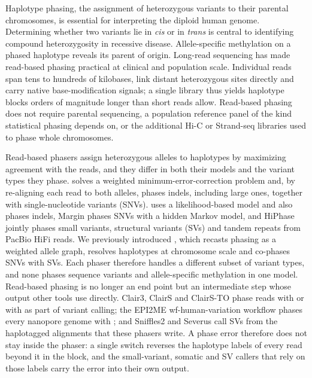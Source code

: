 
Haplotype phasing, the assignment of heterozygous variants to their parental chromosomes, is essential for interpreting the diploid human genome. Determining whether two variants lie in \textit{cis} or in \textit{trans} is central to identifying compound heterozygosity in recessive disease\cite{eisfeldt2025clinical}. Allele-specific methylation on a phased haplotype reveals its parent of origin\cite{akbari2023parentoforigin}. Long-read sequencing has made read-based phasing practical at clinical and population scale. Individual reads span tens to hundreds of kilobases, link distant heterozygous sites directly and carry native base-modification signals; a single library thus yields haplotype blocks orders of magnitude longer than short reads allow\cite{logsdon2020longread,kolmogorov2023scalable}. Read-based phasing does not require parental sequencing, a population reference panel of the kind statistical phasing depends on\cite{hofmeister2023shapeit5}, or the additional Hi-C or Strand-seq libraries used to phase whole chromosomes\cite{porubsky2021fully}.

Read-based phasers assign heterozygous alleles to haplotypes by maximizing agreement with the reads, and they differ in both their models and the variant types they phase. \whatshap solves a weighted minimum-error-correction problem\cite{patterson2015whatshap} and, by re-aligning each read to both alleles, phases indels, including large ones, together with single-nucleotide variants (SNVs)\cite{martin2016whatshap}. \hapcut uses a likelihood-based model and also phases indels\cite{edge2017hapcut2}, Margin phases SNVs with a hidden Markov model\cite{shafin2021margin}, and HiPhase jointly phases small variants, structural variants (SVs) and tandem repeats from PacBio HiFi reads\cite{holt2024hiphase}. We previously introduced \longphase\cite{lin2022longphase}, which recasts phasing as a weighted allele graph, resolves haplotypes at chromosome scale and co-phases SNVs with SVs\cite{smolka2024sniffles2,jiang2020cutesv}. Each phaser therefore handles a different subset of variant types, and none phases sequence variants and allele-specific methylation in one model. Read-based phasing is no longer an end point but an intermediate step whose output other tools use directly. Clair3, ClairS and ClairS-TO phase reads with \whatshap or with \longphase as part of variant calling\cite{zheng2022clair3,zheng2026accelerated,zheng2026clairs,chen2025clairsto}; the EPI2ME wf-human-variation workflow phases every nanopore genome with \longphase\cite{ont2025wfhuman}; and Sniffles2 and Severus call SVs from the haplotagged alignments that these phasers write\cite{smolka2024sniffles2,keskus2025severus}. A phase error therefore does not stay inside the phaser: a single switch reverses the haplotype labels of every read beyond it in the block, and the small-variant, somatic and SV callers that rely on those labels carry the error into their own output.

